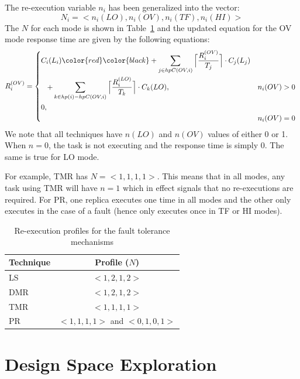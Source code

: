 \documentclass[conference]{IEEEtran}
\begin{document}
	The re-execution variable $n_i$ has been generalized into the vector:
\begin{equation}
	N_i=<n_i(LO),n_i(OV),n_i(TF),n_i(HI)>
\end{equation} 
	The $N$ for each mode is shown in Table~\ref{t:reex} and the updated equation for the OV mode response time are given by the following equations:
	\begin{equation}
\begin{aligned}
R_i^{(OV)} =
\begin{dcases*}
C_i(L_i)\color{red} \color{black}+\sum_{j \in hpC(OV,i)}\Big\lceil\frac{R_i^{(OV)}}{T_j}\Big\rceil \cdot C_j(L_j) \\
\hspace{0.3cm} +\sum_{k \in hp(i)-hpC(OV,i)}\Big\lceil\frac{R_i^{(LO)}}{T_k}\Big\rceil \cdot C_k(LO), &  $n_i(OV)>0$ \\
	0, \\ 	& $n_i(OV)=0$
\end{dcases*}
   \end{aligned}
\end{equation}
	We note that all techniques have $n(LO)$ and $n(OV)$ values of either 0 or 1. When $n=0$, the task is not executing and the response time is simply 0. The same is true for LO mode.
	
	For example, TMR has $N=<1,1,1,1>$. This means that in all modes, any task using TMR will have $n=1$ which in effect signals that no re-executions are required. For PR, one replica executes one time in all modes and the other only executes in the case of a fault (hence only executes once in TF or HI modes).

	\begin{table}
\caption{Re-execution profiles for the fault tolerance mechanisms}
\label{t:reex}
\centering
	\begin{tabular}{@{}l|c@{}}
	\toprule
	Technique & Profile ($N$) \\
	\bottomrule
	LS & $<1,2,1,2>$ \\
	DMR & $<1,2,1,2>$ \\
	TMR & $<1,1,1,1>$ \\
	PR & $<1,1,1,1>$ and $<0,1,0,1>$ \\
	\end{tabular}
\end{table} 	

\section{Design Space Exploration}
\label{s:dse}
\end{document}
